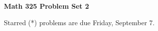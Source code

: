 \documentclass[12pt]{article}
\begin{document}
\def\ctln{\centerline}
\def\msk{\medskip}
\def\bsk{\bigskip}
\def\ssk{\smallskip}
\def\hsk{\hskip.3in}
\def\ra{\rightarrow}
\def\ubr{\underbar}
\def\dsp{\displaystyle}

\def\mt{{\mathcal T}}
\def\mb{{\mathcal B}}
\def\ms{{\mathcal S}}
\def\mu{{\mathcal U}}
\def\mv{{\mathcal V}}

\def\bbr{{\mathbb R}}
\def\bbz{{\mathbb Z}}
\def\bbq{{\mathbb Q}}
\def\bbn{{\mathbb N}}
\def\spc{$~$\hskip.15in$~$}

\def\sset{\subseteq}
\def\del{\partial}
\def\lra{$\Leftrightarrow$}
\def\bra{$\Rightarrow$}




\ctln{\bf Math 325 Problem Set 2}

\msk

\ctln{Starred (*) problems are due Friday, September 7.}
\end{document}
